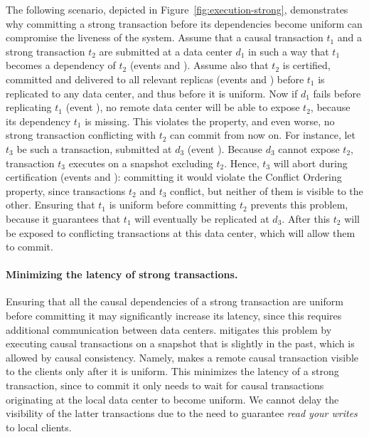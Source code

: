The following scenario, depicted in Figure~\ref{fig:execution-strong},
demonstrates why committing a strong transaction before its dependencies become
uniform can compromise the liveness of the system.
Assume that a causal transaction {\color{\CausalTxColor}$t_1$} and a strong
transaction {\color{\StrongTxColor}$t_2$} are submitted at a data center $d_1$
in such a way that {\color{\CausalTxColor}$t_1$} becomes a dependency of
{\color{\StrongTxColor}$t_2$} (events  and ). Assume also
that {\color{\StrongTxColor}$t_2$} is certified, committed and delivered to all
relevant replicas (events  and ) before
{\color{\CausalTxColor}$t_1$} is replicated to any data center, and thus before
it is uniform. Now if %
$d_1$ fails before replicating
{\color{\CausalTxColor}$t_1$} (event ), no remote data center will be
able to expose {\color{\StrongTxColor}$t_2$}, because its dependency
{\color{\CausalTxColor}$t_1$} is missing. This violates the \liveness{} property,
and even worse, %
no strong transaction conflicting with {\color{\StrongTxColor}$t_2$} can 
commit from now on. For instance, let {\color{\StrongTxColor}$t_3$} be such a
transaction, submitted at $d_3$ (event ). Because $d_3$ cannot expose
{\color{\StrongTxColor}$t_2$}, transaction {\color{\StrongTxColor}$t_3$}
executes on a snapshot excluding {\color{\StrongTxColor}$t_2$}. Hence,
{\color{\StrongTxColor}$t_3$} will abort during certification (events
 and ): committing it would violate the Conflict Ordering
property, since transactions {\color{\StrongTxColor}$t_2$} and
{\color{\StrongTxColor}$t_3$} conflict, but neither of them is visible to the
other. Ensuring that {\color{\CausalTxColor}$t_1$} is uniform before committing
{\color{\StrongTxColor}$t_2$} prevents this problem, because it guarantees that
{\color{\CausalTxColor}$t_1$} will eventually be replicated at $d_3$. After this
{\color{\StrongTxColor}$t_2$} will be exposed to conflicting transactions at
this data center, which will allow them to commit.

\paragraph{Minimizing the latency of strong transactions.} Ensuring that
all the causal dependencies of a strong transaction are uniform before
committing it may significantly increase its latency, since this requires
additional communication between data centers. \System mitigates this problem by
executing causal transactions on a snapshot that is slightly in the past, which
is allowed by causal consistency. Namely, \System makes a remote causal
  transaction visible to the clients only after it is uniform.
This minimizes the latency of a strong transaction, since to commit it
only needs to wait for causal transactions originating at the local data center
to become uniform. We cannot delay the visibility of the latter transactions due
to the need to guarantee {\em read your writes} to local clients.



